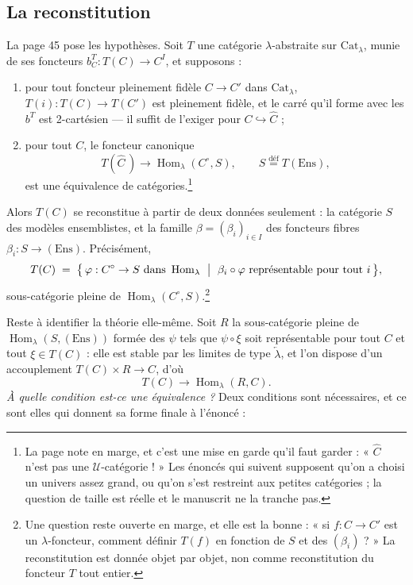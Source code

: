 \documentclass[11pt,a4paper]{article}
\begin{document}
\subsection*{La reconstitution}

La page 45 pose les hypothèses. Soit $T$ une catégorie $\lambda$-abstraite sur
$\mathrm{Cat}_{\lambda}$, munie de ses foncteurs $b^{T}_{C} : T(C) \to C^{I}$,
et supposons :

\begin{enumerate}
\item[a)] pour tout foncteur pleinement fidèle $C \to C'$ dans
$\mathrm{Cat}_{\lambda}$, $T(i) : T(C) \to T(C')$ est pleinement fidèle, et le
carré qu'il forme avec les $b^{T}$ est 2-cartésien — il suffit de l'exiger pour
$C \hookrightarrow \widehat{C}$ ;
\item[b)] pour tout $C$, le foncteur canonique
\[
T(\widehat{C}\,) \longrightarrow \operatorname{Hom}_{\lambda}(C^{\circ}, S),
\qquad S \overset{\text{déf}}{=} T(\mathrm{Ens}),
\]
est une équivalence de catégories.\footnote{La page note en marge, et c'est une
mise en garde qu'il faut garder : « $\widehat{C}$ n'est pas une
$\mathcal{U}$-catégorie ! » Les énoncés qui suivent supposent qu'on a choisi un
univers assez grand, ou qu'on s'est restreint aux petites catégories ; la
question de taille est réelle et le manuscrit ne la tranche pas.}
\end{enumerate}

Alors $T(C)$ se reconstitue à partir de deux données seulement : la catégorie
$S$ des modèles ensemblistes, et la famille $\beta = (\beta_{i})_{i \in I}$ des
foncteurs fibres $\beta_{i} : S \to (\mathrm{Ens})$. Précisément,
\[
T(C) \;=\; \bigl\{\, \varphi : C^{\circ} \to S \ \text{dans}
\ \operatorname{Hom}_{\lambda} \ \bigm| \ \beta_{i} \circ \varphi
\ \text{représentable pour tout } i \,\bigr\},
\]
sous-catégorie pleine de $\operatorname{Hom}_{\lambda}(C^{\circ},
S)$.\footnote{Une question reste ouverte en marge, et elle est la bonne : « si
$f : C \to C'$ est un $\lambda$-foncteur, comment définir $T(f)$ en fonction de
$S$ et des $(\beta_{i})$ ? » La reconstitution est donnée objet par objet, non
comme reconstitution du foncteur $T$ tout entier.}

Reste à identifier la théorie elle-même. Soit $R$ la sous-catégorie pleine de
$\operatorname{Hom}_{\lambda}(S, (\mathrm{Ens}))$ formée des $\psi$ tels que
$\psi \circ \xi$ soit représentable pour tout $C$ et tout $\xi \in T(C)$ : elle
est stable par les limites de type $\underleftarrow{\lambda}$, et l'on dispose
d'un accouplement $T(C) \times R \to C$, d'où
\[
T(C) \longrightarrow \operatorname{Hom}_{\lambda}(R, C).
\]
\emph{À quelle condition est-ce une équivalence ?} Deux conditions sont
nécessaires, et ce sont elles qui donnent sa forme finale à l'énoncé :
\end{document}
